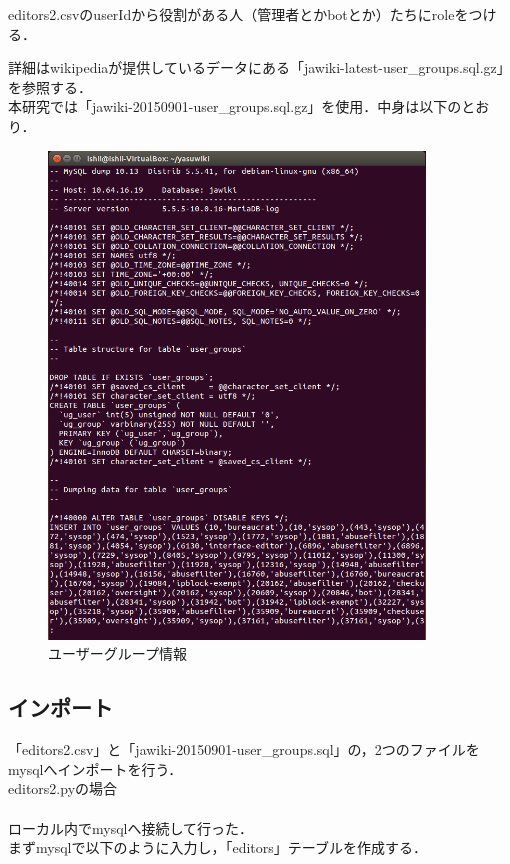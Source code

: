 editors2.csvのuserIdから役割がある人（管理者とかbotとか）たちにroleをつける．

\clearpage

詳細はwikipediaが提供しているデータにある「jawiki-latest-user\_groups.sql.gz」を参照する． \\
本研究では「jawiki-20150901-user\_groups.sql.gz」を使用．中身は以下のとおり． 

\begin{figure}[H]
\centering
\includegraphics[width=10cm]{user_group1.png}
\caption{ユーザーグループ情報}\label{サンプル図}
\end{figure}


\clearpage

\subsection{インポート}

「editors2.csv」と「jawiki-20150901-user\_groups.sql」の，2つのファイルをmysqlへインポートを行う． \\

editors2.pyの場合 \\
\\
ローカル内でmysqlへ接続して行った．\\
まずmysqlで以下のように入力し，「editors」テーブルを作成する．


